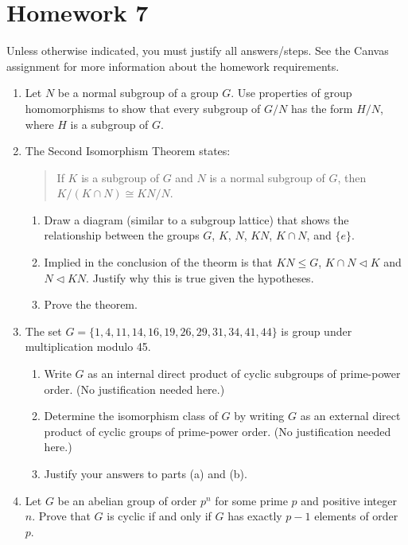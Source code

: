 \documentclass{article}
\newcommand{\iso}{\cong}
\newcommand{\normal}{\triangleleft}
\begin{document}
\section*{Homework 7}

Unless otherwise indicated, you must justify all answers/steps. See the Canvas assignment for more information about the homework requirements. 

\begin{enumerate}

    \item Let $N$ be a normal subgroup of a group $G$. Use properties of group homomorphisms to show that every subgroup of $G/N$ has the form $H/N$, where $H$ is a subgroup of $G$. 
    
    \item The Second Isomorphism Theorem states:
        \begin{quote}
            If $K$ is a subgroup of $G$ and $N$ is a normal subgroup of $G$, then $K/(K\cap N)\iso KN/N$.
        \end{quote}

        \begin{enumerate}
            \item Draw a diagram (similar to a subgroup lattice) that shows the relationship between the groups $G$, $K$, $N$, $KN$, $K\cap N$, and $\{e\}$. 

            \item Implied in the conclusion of the theorm is that $KN\le G$, $K\cap N\normal K$ and $N\normal KN$. Justify why this is true given the hypotheses.
    
            \item Prove the theorem.

        \end{enumerate}
        
    \item The set $G=\{1,4,11,14,16,19,26,29,31,34,41,44\}$ is  group under multiplication modulo 45. 
        \begin{enumerate}
            \item Write $G$ as an internal direct product of cyclic subgroups of prime-power order. (No justification needed here.)
            
            \item Determine the isomorphism class of $G$ by writing $G$ as an external direct product of cyclic groups of prime-power order. (No justification needed here.)
            
            \item Justify your answers to parts (a) and (b).
            
        \end{enumerate}
    
    \item Let $G$ be an abelian group of order $p^n$ for some prime $p$ and positive integer $n$. Prove that $G$ is cyclic if and only if $G$ has exactly $p-1$ elements of order $p$. 

    \end{enumerate}
\end{document}
